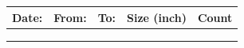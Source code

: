 \begin{appendices}
\begin{landscape}
\begin{tabular}{|c|c|c|c|c|}
\hline
Date: \hspace{3cm} & From: \hspace{3cm} & To: \hspace{3cm} & Size (inch)\hspace{1cm}  & Count \hspace{1cm} \\  \hline
                               &                                  &                              &                                         & \\ 
                               &                                  &                              &                                         & \\ 
                               &                                  &                              &                                         & \\ \hline
\end{tabular}

\vspace{1cm}


\end{landscape}
\end{appendices}
